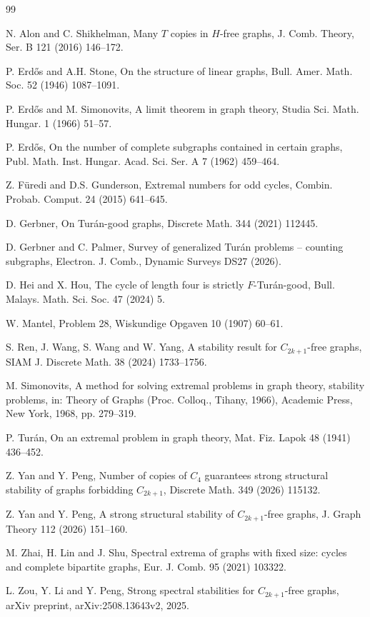 \documentclass[11pt]{article}
\theoremstyle{definition}
\theoremstyle{plain}
\theoremstyle{remark}
\theoremstyle{plain}
\numberwithin{equation}{section}
\begin{document}
\begin{thebibliography}{99}

N. Alon and C. Shikhelman, Many $T$ copies in $H$-free graphs, J. Comb. Theory, Ser. B 121 (2016) 146--172.

P. Erd\H{o}s and A.H. Stone, On the structure of linear graphs, Bull. Amer. Math. Soc. 52 (1946) 1087--1091.

P. Erd\H{o}s and M. Simonovits, A limit theorem in graph theory, Studia Sci. Math. Hungar. 1 (1966) 51--57.

P. Erd\H{o}s, On the number of complete subgraphs contained in certain graphs, Publ. Math. Inst. Hungar. Acad. Sci. Ser. A 7 (1962) 459--464.

Z. F\"uredi and D.S. Gunderson, Extremal numbers for odd cycles, Combin. Probab. Comput. 24 (2015) 641--645.

D. Gerbner, On Tur\'an-good graphs, Discrete Math. 344 (2021) 112445.

D. Gerbner and C. Palmer, Survey of generalized Tur\'an problems -- counting subgraphs, Electron. J. Comb., Dynamic Surveys DS27 (2026).

D. Hei and X. Hou, The cycle of length four is strictly $F$-Tur\'an-good, Bull. Malays. Math. Sci. Soc. 47 (2024) 5.

W. Mantel, Problem 28, Wiskundige Opgaven 10 (1907) 60--61.

S. Ren, J. Wang, S. Wang and W. Yang, A stability result for $C_{2k+1}$-free graphs, SIAM J. Discrete Math. 38 (2024) 1733--1756.

M. Simonovits, A method for solving extremal problems in graph theory, stability problems, in: Theory of Graphs (Proc. Colloq., Tihany, 1966), Academic Press, New York, 1968, pp. 279--319.

P. Tur\'an, On an extremal problem in graph theory, Mat. Fiz. Lapok 48 (1941) 436--452.

Z. Yan and Y. Peng, Number of copies of $C_4$ guarantees strong structural stability of graphs forbidding $C_{2k+1}$, Discrete Math. 349 (2026) 115132.

Z. Yan and Y. Peng, A strong structural stability of $C_{2k+1}$-free graphs, J. Graph Theory 112 (2026) 151--160.

M. Zhai, H. Lin and J. Shu, Spectral extrema of graphs with fixed size: cycles and complete bipartite graphs, Eur. J. Comb. 95 (2021) 103322.

L. Zou, Y. Li and Y. Peng, Strong spectral stabilities for $C_{2k+1}$-free graphs, arXiv preprint, arXiv:2508.13643v2, 2025.

\end{thebibliography}
\end{document}
